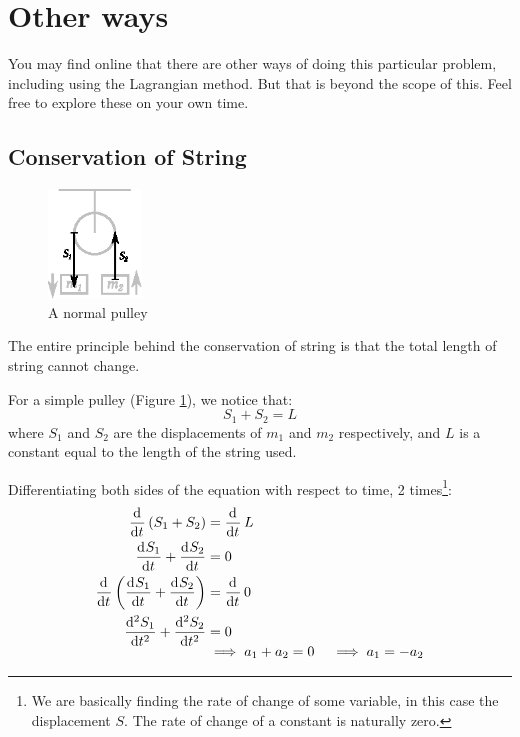 \documentclass[11pt]{article}
\begin{document}
	\section*{Other ways}
	You may find online that there are other ways of doing this particular problem, including using the Lagrangian method. But that is beyond the scope of this. Feel free to explore these on your own time.
	
	\pagebreak
	
	\begin{appendices}
		\section{Conservation of String}
		\label{appdx:COS}
		\begin{figure}
			\centering
			\vspace{-0.7cm}
			\includegraphics[width=2.5cm]{pulleyCOS.eps}
			\caption{A normal pulley}
			\label{fig:PconservationOfString}
		\end{figure}
		
		The entire principle behind the conservation of string is that the total length of string cannot change.
		
		For a simple pulley (Figure \ref{fig:PconservationOfString}), we notice that:
		\begin{equation*}
		S_1 + S_2 = L
		\end{equation*}
		where $S_1$ and $S_2$ are the displacements of $m_1$ and $m_2$ respectively, and $L$ is a constant equal to the length of the string used.
		
		Differentiating both sides of the equation with respect to time, 2 times\footnote{We are basically finding the rate of change of some variable, in this case the displacement $S$. The rate of change of a constant is naturally zero.}:
		\begingroup
		\addtolength{\jot}{0.7em}
		\begin{align*}
		\dod{}{t}\left(S_1 + S_2 \right) &= \dod{}{t}L \\
		\dod{S_1}{t} + \dod{S_2}{t} &= 0 \\
		\dod{}{t}\left(\dod{S_1}{t} + \dod{S_2}{t}\right) &= \dod{}{t} 0 \\
		\dod[2]{S_1}{t} + \dod[2]{S_2}{t} &= 0 \\[-0.5em]
		&\implies a_1 + a_2 = 0 \hspace{1em}\implies a_1 = -a_2 
		\end{align*}
		\endgroup
		

\end{appendices}
\end{document}
